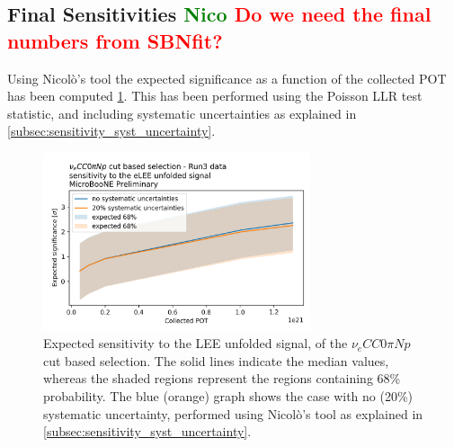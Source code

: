 \documentclass[a4paper]{article}
\newcommand{\nueccnopinp}{$\nu_e CC 0\pi Np$ }
\begin{document}
\subsection{Final Sensitivities \textcolor{green}{Nico} \textcolor{red}{Do we need the final numbers from SBNfit?}}

Using Nicol\`o's tool the expected significance as a function of the collected POT has been computed \ref{fig:sensitivity_function_pot}.
This has been performed using the Poisson LLR test statistic, and including systematic uncertainties as explained in \ref{subsec:sensitivity_syst_uncertainty}.

\begin{figure}[H]
    \begin{center}
    \includegraphics[width=0.7\textwidth]{Sensitivity/sensitivity_vs_pot.png}
    \caption{Expected sensitivity to the LEE unfolded signal, of the \nueccnopinp cut based selection. The solid lines indicate the median values, whereas the shaded regions represent the regions containing 68\% probability.
    The blue (orange) graph shows the case with no (20\%) systematic uncertainty, performed using Nicol\`o's tool as explained in \ref{subsec:sensitivity_syst_uncertainty}.
    }
    \label{fig:sensitivity_function_pot}
    \end{center}
\end{figure}
\end{document}
